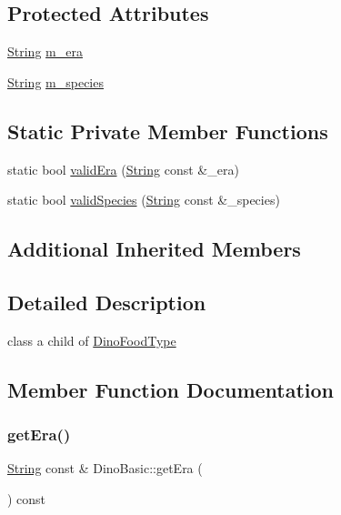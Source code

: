 \subsection*{Protected Attributes}
\begin{DoxyCompactItemize}
\item 
\hyperlink{classString}{String} \hyperlink{classDinoBasic_aed65c06db4fe56f7a460e0b202ac8023}{m\+\_\+era}
\item 
\hyperlink{classString}{String} \hyperlink{classDinoBasic_a4579f8f1e6565f5a5f12a86d6b199044}{m\+\_\+species}
\end{DoxyCompactItemize}
\subsection*{Static Private Member Functions}
\begin{DoxyCompactItemize}
\item 
static bool \hyperlink{classDinoBasic_ac76def9187ceb6c2546809c6a9cb0327}{valid\+Era} (\hyperlink{classString}{String} const \&\+\_\+era)
\item 
static bool \hyperlink{classDinoBasic_ac3b7303ce6b953511db08ae189fd42b7}{valid\+Species} (\hyperlink{classString}{String} const \&\+\_\+species)
\end{DoxyCompactItemize}
\subsection*{Additional Inherited Members}


\subsection{Detailed Description}
class a child of \hyperlink{classDinoFoodType}{Dino\+Food\+Type} 

\subsection{Member Function Documentation}
\mbox{\label{classDinoBasic_ad257a3c268719162ac06ba2973386bf7}} 
\subsubsection{\texorpdfstring{get\+Era()}{getEra()}}
{\footnotesize\ttfamily \hyperlink{classString}{String} const  \& Dino\+Basic\+::get\+Era (\begin{DoxyParamCaption}{ }\end{DoxyParamCaption}) const}

